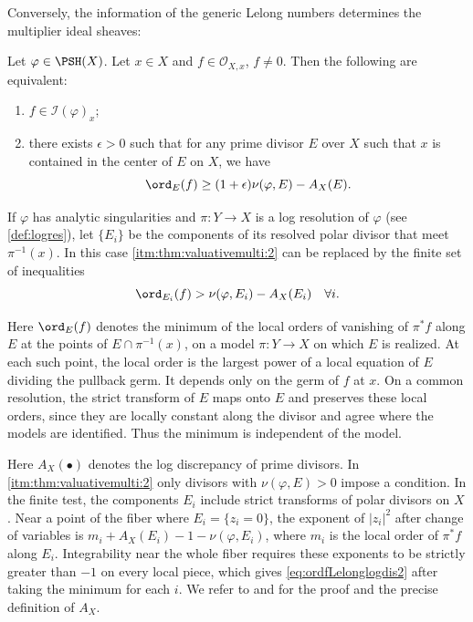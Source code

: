 Conversely, the information of the generic Lelong numbers determines the multiplier ideal sheaves:
\begin{theorem}\label{thm:valuativemulti}
    Let $\varphi\in \PSH(X)$.
    Let $x\in X$ and $f\in \mathcal{O}_{X,x}$, $f\neq 0$. Then the following are equivalent:
    \begin{enumerate}
        \item\label{itm:thm:valuativemulti:1} $f\in \mathcal{I}(\varphi)_x$;
        \item\label{itm:thm:valuativemulti:2} there exists $\epsilon>0$ such that for any prime divisor $E$ over $X$ such that $x$ is contained in the center of $E$ on $X$, we have
            \begin{equation}\label{eq:ordfLelonglogdis}
                \ord_E(f)\geq (1+\epsilon) \nu(\varphi,E)-A_X(E).
            \end{equation}
    \end{enumerate}
    If $\varphi$ has analytic singularities and $\pi\colon Y\rightarrow X$ is a log resolution of $\varphi$ (see \cref{def:logres}), let $\{E_i\}$ be the components of its resolved polar divisor that meet $\pi^{-1}(x)$. In this case \ref{itm:thm:valuativemulti:2} can be replaced by the finite set of inequalities
    \begin{equation}\label{eq:ordfLelonglogdis2}
    \ord_{E_i}(f)> \nu(\varphi,E_i)-A_X(E_i)\quad \forall i.
    \end{equation}
\end{theorem}
Here $\ord_E(f)$ denotes the minimum of the local orders of vanishing of $\pi^*f$ along $E$ at the points of $E\cap\pi^{-1}(x)$, on a model $\pi\colon Y\to X$ on which $E$ is realized. At each such point, the local order is the largest power of a local equation of $E$ dividing the pullback germ. It depends only on the germ of $f$ at $x$. On a common resolution, the strict transform of $E$ maps onto $E$ and preserves these local orders, since they are locally constant along the divisor and agree where the models are identified. Thus the minimum is independent of the model.

Here $A_X(\bullet)$ denotes the log discrepancy of prime divisors. In \ref{itm:thm:valuativemulti:2} only divisors with $\nu(\varphi,E)>0$ impose a condition. In the finite test, the components $E_i$ include strict transforms of polar divisors on $X$. Near a point of the fiber where $E_i=\{z_i=0\}$, the exponent of $|z_i|^2$ after change of variables is $m_i+A_X(E_i)-1-\nu(\varphi,E_i)$, where $m_i$ is the local order of $\pi^*f$ along $E_i$. Integrability near the whole fiber requires these exponents to be strictly greater than $-1$ on every local piece, which gives \eqref{eq:ordfLelonglogdis2} after taking the minimum for each $i$.
We refer to \cite[Corollary~10.18, Proposition~10.12]{Bou17} and \cite[Definition~12.6.3 and Theorem~12.6.9]{FPT} for the proof and the precise definition of $A_X$.

